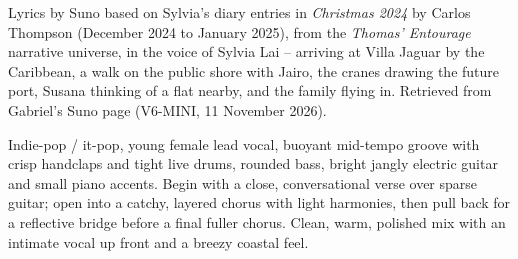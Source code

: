 
\label{sec:stay-a-little}
\begin{notes}
Lyrics by Suno based on Sylvia's diary entries in \emph{Christmas 2024} by Carlos Thompson (December 2024 to January 2025), from the \emph{Thomas' Entourage} narrative universe, in the voice of Sylvia Lai -- arriving at Villa Jaguar by the Caribbean, a walk on the public shore with Jairo, the cranes drawing the future port, Susana thinking of a flat nearby, and the family flying in. Retrieved from Gabriel's Suno page (V6-MINI, 11 November 2026).
\end{notes}
\begin{style}
Indie-pop / it-pop, young female lead vocal, buoyant mid-tempo groove with crisp handclaps and tight live drums, rounded bass, bright jangly electric guitar and small piano accents. Begin with a close, conversational verse over sparse guitar; open into a catchy, layered chorus with light harmonies, then pull back for a reflective bridge before a final fuller chorus. Clean, warm, polished mix with an intimate vocal up front and a breezy coastal feel.
\end{style}
